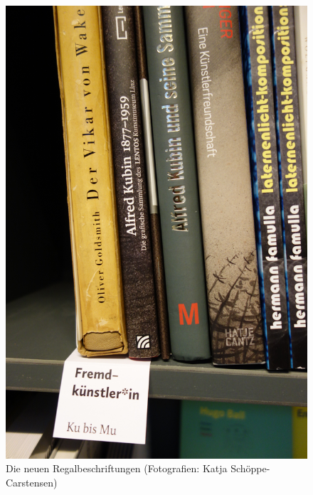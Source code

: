 \documentclass[a4paper,
fontsize=11pt,
oneside,
numbers=noperiodatend,
parskip=half-,
bibliography=totoc,
final
]{scrartcl}
\begin{document}
\begin{figure}
\centering
\includegraphics{img/Schoeppe_5.jpg}
\caption{Die neuen Regalbeschriftungen (Fotografien: Katja
Schöppe-Carstensen)}
\end{figure}
\end{document}
